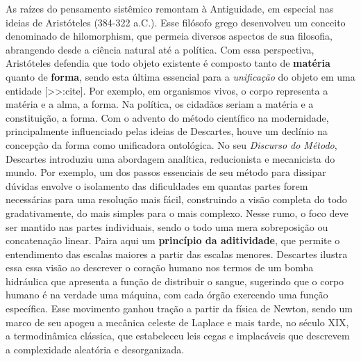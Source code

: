 \documentclass[./main.tex]{subfiles}
\begin{document}
\par As raízes do pensamento sistêmico remontam à Antiguidade, em especial nas ideias de Aristóteles (384-322 a.C.). Esse filósofo grego desenvolveu um conceito denominado de \gls{hilomorphism}, que permeia diversos aspectos de sua filosofia, abrangendo desde a ciência natural até a política. Com essa perspectiva, Aristóteles defendia que todo objeto existente é composto tanto de \textbf{matéria} quanto de \textbf{forma}, sendo esta última essencial para a \textit{unificação} do objeto em uma entidade [>>:cite]. Por exemplo, em organismos vivos, o corpo representa a matéria e a alma, a forma. Na política, os cidadãos seriam a matéria e a constituição, a forma. Com o advento do método científico na modernidade, principalmente influenciado pelas ideias de Descartes, houve um declínio na concepção da forma como unificadora ontológica. No seu \textit{Discurso do Método}, Descartes introduziu uma abordagem analítica, reducionista e mecanicista do mundo. Por exemplo, um dos passos essenciais de seu método para dissipar dúvidas envolve o isolamento das dificuldades em quantas partes forem necessárias para uma resolução mais fácil, construindo a visão completa do todo gradativamente, do mais simples para o mais complexo. Nesse rumo, o foco deve ser mantido nas partes individuais, sendo o todo uma mera sobreposição ou concatenação linear. Paira aqui um \textbf{princípio da aditividade}, que permite o entendimento das escalas maiores a partir das escalas menores. Descartes ilustra essa essa visão ao descrever o coração humano nos termos de um bomba hidráulica que apresenta a função de distribuir o sangue, sugerindo que o corpo humano é na verdade uma máquina, com cada órgão exercendo uma função específica. Esse movimento ganhou tração a partir da física de Newton, sendo um marco de seu apogeu a mecânica celeste de Laplace e mais tarde, no século XIX, a termodinâmica clássica, que estabeleceu leis cegas e implacáveis que descrevem a complexidade aleatória e desorganizada.
\end{document}
